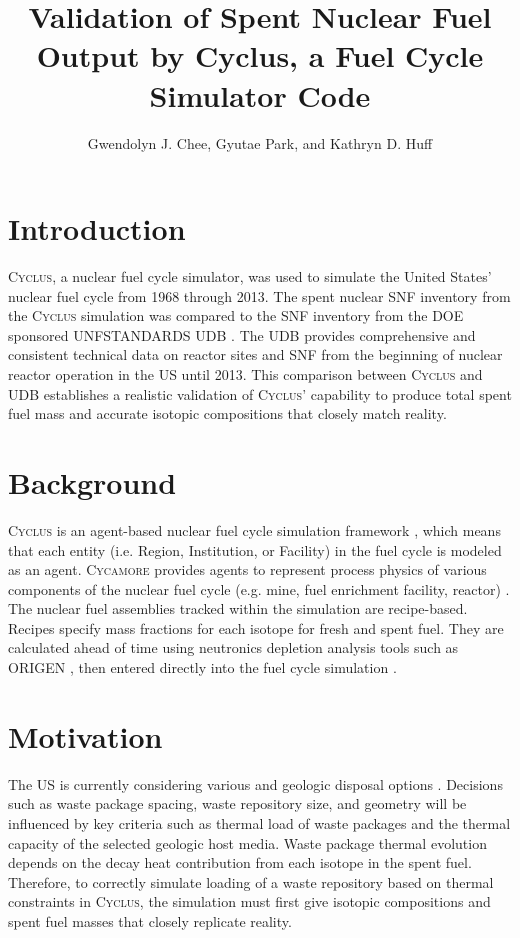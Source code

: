 \documentclass{anstrans}
\title{Validation of Spent Nuclear Fuel Output by Cyclus, a Fuel Cycle Simulator Code}
\author{Gwendolyn J. Chee, Gyutae Park, and Kathryn D. Huff}
\institute{
Dept. of Nuclear, Plasma and Radiological Engineering, University of Illinois at Urbana-Champaign \\
gchee2@illinois.edu
}
\newcommand{\Cyclus}{\textsc{Cyclus}\xspace}%
\newcommand{\Cycamore}{\textsc{Cycamore}\xspace}%
\begin{document}
\section{Introduction}
\Cyclus \cite{carlsen_cyclus_2014}, a nuclear fuel cycle simulator, was used to simulate the
United States' nuclear fuel cycle from 1968 through 2013. The spent nuclear 
\gls{SNF} inventory from the \Cyclus simulation was compared to the \gls{SNF} 
inventory from the \gls{DOE} sponsored \gls{UNFSTANDARDS} \gls{UDB} 
\cite{peterson_unf-st&dards_2017}. The \gls{UDB} provides comprehensive and 
consistent technical data on reactor sites and \gls{SNF} from the beginning of 
nuclear reactor operation in the \gls{US} until 2013. This comparison 
between \Cyclus and \gls{UDB} establishes a realistic validation of \Cyclus' 
capability to produce total spent fuel mass and accurate isotopic compositions 
that closely match reality.

\section{Background}
\Cyclus is an agent-based nuclear fuel cycle simulation framework 
\cite{huff_fundamental_2016}, which means that each entity (i.e. Region, 
Institution, or Facility) in the fuel cycle is modeled as an agent. 
\Cycamore \cite{carlsen_cycamore_2014} provides agents to represent process 
physics of various components of the nuclear fuel cycle (e.g. mine, fuel 
enrichment facility, reactor) \cite{huff_extensions_2014}. The nuclear fuel 
assemblies tracked within the simulation are recipe-based. Recipes specify mass 
fractions for each isotope for fresh and spent fuel. They are calculated ahead 
of time using neutronics depletion analysis tools such as ORIGEN 
\cite{bell_origen_1973}, then entered directly into the fuel cycle simulation 
\cite{peterson_additional_2017}. 

\section{Motivation}
The \gls{US} is currently considering various and geologic disposal 
options \cite{DOE_strategy_2013}. Decisions such as waste package spacing, 
waste repository size, and geometry will be influenced by key criteria such as 
thermal load of waste packages and the thermal capacity of the selected 
geologic host media. Waste package thermal evolution depends on the decay heat 
contribution from each isotope in the spent fuel. Therefore, to correctly 
simulate loading of a waste repository based on thermal constraints in \Cyclus, 
the simulation must first give isotopic compositions and spent fuel masses that 
closely replicate reality. 
\end{document}
